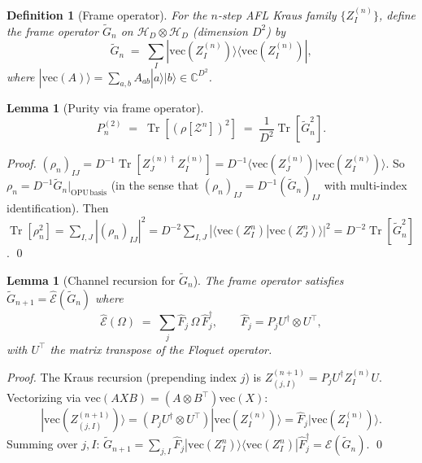 \documentclass[12pt,a4paper]{article}
\newtheorem{lemma}[theorem]{Lemma}
\newtheorem{definition}[theorem]{Definition}
\begin{document}
\begin{definition}[Frame operator]
\label{def:frame_op}
For the $n$-step AFL Kraus family $\{Z_I^{(n)}\}$, define the
\emph{frame operator} $\widetilde{G}_n$ on $\mathcal{H}_D\otimes\mathcal{H}_D$
(dimension $D^2$) by
\[
  \widetilde{G}_n \;=\; \sum_I |\mathrm{vec}(Z_I^{(n)})\rangle\langle\mathrm{vec}(Z_I^{(n)})|,
\]
where $|\mathrm{vec}(A)\rangle = \sum_{a,b}A_{ab}|a\rangle|b\rangle\in\mathbb{C}^{D^2}$.
\end{definition}

\begin{lemma}[Purity via frame operator]
\label{lem:purity_frame}
\[
  P_n^{(2)} \;=\; \operatorname{Tr}\!\left[(\rho[\mathcal{Z}^n])^2\right]
  \;=\; \frac{1}{D^2}\operatorname{Tr}\!\left[\widetilde{G}_n^2\right].
\]
\end{lemma}

\begin{proof}
$(\rho_n)_{IJ}=D^{-1}\operatorname{Tr}[Z_J^{(n)\dagger}Z_I^{(n)}]=D^{-1}\langle\mathrm{vec}(Z_J^{(n)})|\mathrm{vec}(Z_I^{(n)})\rangle$.
So $\rho_n = D^{-1}\widetilde{G}_n|_{\mathrm{OPU\,basis}}$ (in the sense that
$(\rho_n)_{IJ}= D^{-1}(\widetilde{G}_n)_{IJ}$ with multi-index identification).
Then
$\operatorname{Tr}[\rho_n^2]=\sum_{I,J}|(\rho_n)_{IJ}|^2=D^{-2}\sum_{I,J}|\langle\mathrm{vec}(Z_I^n)|\mathrm{vec}(Z_J^n)\rangle|^2
=D^{-2}\operatorname{Tr}[\widetilde{G}_n^2]$. \qed
\end{proof}

\begin{lemma}[Channel recursion for $\widetilde{G}_n$]
\label{lem:channel_rec}
The frame operator satisfies $\widetilde{G}_{n+1}=\hat{\mathcal{E}}(\widetilde{G}_n)$ where
\[
  \hat{\mathcal{E}}(\Omega) \;=\; \sum_j \hat{F}_j\,\Omega\,\hat{F}_j^\dagger,
  \qquad
  \hat{F}_j = P_j U^\dagger \otimes U^\top,
\]
with $U^\top$ the matrix transpose of the Floquet operator.
\end{lemma}

\begin{proof}
The Kraus recursion (prepending index $j$) is
$Z_{(j,I)}^{(n+1)} = P_j U^\dagger Z_I^{(n)} U$.
Vectorizing via $\mathrm{vec}(AXB)=(A\otimes B^\top)\mathrm{vec}(X)$:
\[
  |\mathrm{vec}(Z_{(j,I)}^{(n+1)})\rangle
  = (P_j U^\dagger \otimes U^\top)|\mathrm{vec}(Z_I^{(n)})\rangle
  = \hat{F}_j|\mathrm{vec}(Z_I^{(n)})\rangle.
\]
Summing over $j,I$:
$\widetilde{G}_{n+1}=\sum_{j,I}\hat{F}_j|\mathrm{vec}(Z_I^n)\rangle\langle\mathrm{vec}(Z_I^n)|\hat{F}_j^\dagger
=\hat{\mathcal{E}}(\widetilde{G}_n)$. \qed
\end{proof}
\end{document}
